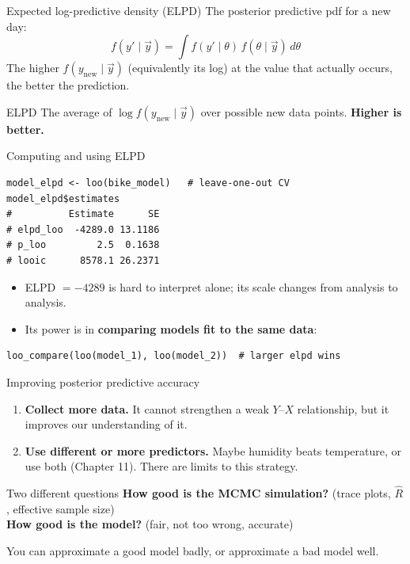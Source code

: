 \documentclass[aspectratio=43,11pt]{beamer}
\begin{document}
\begin{frame}{Expected log-predictive density (ELPD)}
  The posterior predictive pdf for a new day:
  \[
    f(y'\mid\vec y)=\int f(y'\mid\theta)\,f(\theta\mid\vec y)\,d\theta
  \]
  The higher $f(y_{\text{new}}\mid\vec y)$ (equivalently its log) at the value that actually occurs, the better the prediction.
  \begin{block}{ELPD}
    The average of $\log f(y_{\text{new}}\mid\vec y)$ over possible new data points. \textbf{Higher is better.}
  \end{block}
\end{frame}

\begin{frame}[fragile]{Computing and using ELPD}
\begin{lstlisting}
model_elpd <- loo(bike_model)   # leave-one-out CV
model_elpd$estimates
#          Estimate      SE
# elpd_loo  -4289.0 13.1186
# p_loo         2.5  0.1638
# looic      8578.1 26.2371
\end{lstlisting}
  \begin{itemize}
    \item ELPD $=-4289$ is hard to interpret alone; its scale changes from analysis to analysis.
    \item Its power is in \textbf{comparing models fit to the same data}:
  \end{itemize}
\begin{lstlisting}
loo_compare(loo(model_1), loo(model_2))  # larger elpd wins
\end{lstlisting}
\end{frame}

\begin{frame}{Improving posterior predictive accuracy}
  \begin{enumerate}
    \item \textbf{Collect more data.} It cannot strengthen a weak $Y$--$X$ relationship, but it improves our understanding of it.
    \item \textbf{Use different or more predictors.} Maybe humidity beats temperature, or use both (Chapter 11). There are limits to this strategy.
  \end{enumerate}

  \begin{alertblock}{Two different questions}
    \textbf{How good is the MCMC simulation?} (trace plots, $\hat R$, effective sample size)\\
    \textbf{How good is the model?} (fair, not too wrong, accurate)

    You can approximate a good model badly, or approximate a bad model well.
  \end{alertblock}
\end{frame}
\end{document}
